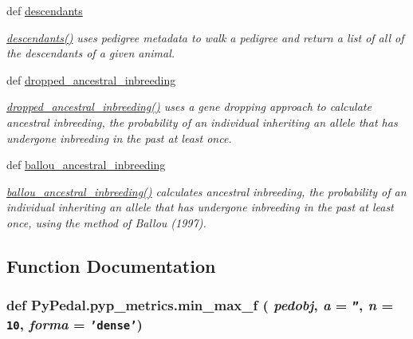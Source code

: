 \begin{CompactItemize}
def \hyperlink{namespacePyPedal_1_1pyp__metrics_132a4b6580f08cb10db3b376849a2bfe}{descendants}
\begin{CompactList}\small\item\em \hyperlink{namespacePyPedal_1_1pyp__metrics_132a4b6580f08cb10db3b376849a2bfe}{descendants()} uses pedigree metadata to walk a pedigree and return a list of all of the descendants of a given animal. \item\end{CompactList}\item 
def \hyperlink{namespacePyPedal_1_1pyp__metrics_e1cfcdb6871cd70b61e99da591975b58}{dropped\_\-ancestral\_\-inbreeding}
\begin{CompactList}\small\item\em \hyperlink{namespacePyPedal_1_1pyp__metrics_e1cfcdb6871cd70b61e99da591975b58}{dropped\_\-ancestral\_\-inbreeding()} uses a gene dropping approach to calculate ancestral inbreeding, the probability of an individual inheriting an allele that has undergone inbreeding in the past at least once. \item\end{CompactList}\item 
def \hyperlink{namespacePyPedal_1_1pyp__metrics_6185ce91b4815918ed935f1d4fb19714}{ballou\_\-ancestral\_\-inbreeding}
\begin{CompactList}\small\item\em \hyperlink{namespacePyPedal_1_1pyp__metrics_6185ce91b4815918ed935f1d4fb19714}{ballou\_\-ancestral\_\-inbreeding()} calculates ancestral inbreeding, the probability of an individual inheriting an allele that has undergone inbreeding in the past at least once, using the method of Ballou (1997). \item\end{CompactList}\end{CompactItemize}


\subsection{Function Documentation}
\hypertarget{namespacePyPedal_1_1pyp__metrics_f92db7d70e697a1f299c1b01775e9378}{
\subsubsection[min\_\-max\_\-f]{\setlength{\rightskip}{0pt plus 5cm}def Py\-Pedal.pyp\_\-metrics.min\_\-max\_\-f ( {\em pedobj},  {\em a} = {\tt ''},  {\em n} = {\tt 10},  {\em forma} = {\tt 'dense'})}}
\label{namespacePyPedal_1_1pyp__metrics_f92db7d70e697a1f299c1b01775e9378}


